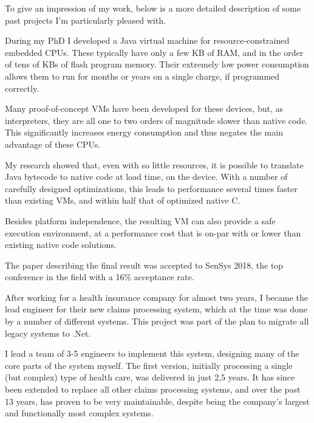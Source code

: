 \documentclass[10pt,a4paper]{../altacv}
\begin{document}
\begin{fullwidth}

To give an impression of my work, below is a more detailed description of some past projects I’m particularly pleased with.

\bigskip


During my PhD I developed a Java virtual machine for resource-constrained embedded CPUs. These typically have only a few KB of RAM, and in the order of tens of KBs of flash program memory. Their extremely low power consumption allows them to run for months or years on a single charge, if programmed correctly.

\medskip\medskip

Many proof-of-concept VMs have been developed for these devices, but, as interpreters, they are all one to two orders of magnitude slower than native code. This significantly increases energy consumption and thus negates the main advantage of these CPUs.

\medskip\medskip

My research showed that, even with so little resources, it is possible to translate Java bytecode to native code at load time, on the device. With a number of carefully designed optimizations, this leads to performance several times faster than existing VMs, and within half that of optimized native C.

\medskip\medskip

Besides platform independence, the resulting VM can also provide a safe execution environment, at a performance cost that is on-par with or lower than existing native code solutions.

\medskip\medskip

The paper describing the final result was accepted to SenSys 2018, the top conference in the field with a 16\% acceptance rate.

\bigskip\bigskip

After working for a health insurance company for almost two years, I became the lead engineer for their new claims processing system, which at the time was done by a number of different systems. This project was part of the plan to migrate all legacy systems to .Net.

\medskip\medskip

I lead a team of 3-5 engineers to implement this system, designing many of the core parts of the system myself. The first version, initially processing a single (but complex) type of health care, was delivered in just 2,5 years. It has since been extended to replace all other claims processing systems, and over the past 13 years, has proven to be very maintainable, despite being the company’s largest and functionally most complex systems.


\end{fullwidth}
\end{document}
